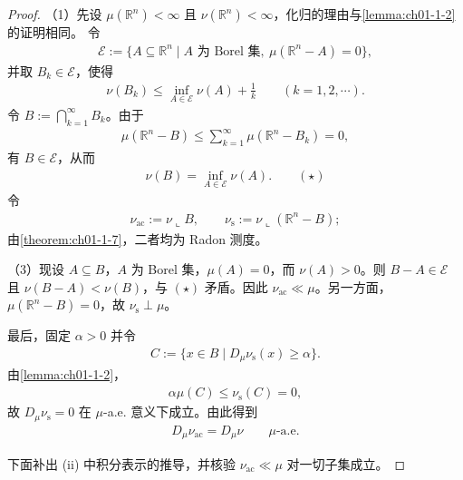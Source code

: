 \documentclass[../../main.tex]{subfiles}%
\begin{document}
\begin{proof}
（1）先设 $\mu(\mathbb{R}^n)<\infty$ 且 $\nu(\mathbb{R}^n)<\infty$，化归的理由与\cref{lemma:ch01-1-2}的证明相同。%
令
\begin{align*}
\mathcal{E}:=\{A\subseteq\mathbb{R}^n\mid A\text{ 为 Borel 集},\ \mu(\mathbb{R}^n-A)=0\},
\end{align*}
并取 $B_k\in\mathcal{E}$，使得
\begin{align*}
\nu(B_k)\leqslant\inf_{A\in\mathcal{E}}\nu(A)+\frac{1}{k}\qquad(k=1,2,\cdots).
\end{align*}
令 $B:=\bigcap_{k=1}^{\infty}B_k$。由于
\begin{align*}
\mu(\mathbb{R}^n-B)\leqslant\sum_{k=1}^{\infty}\mu(\mathbb{R}^n-B_k)=0,
\end{align*}
有 $B\in\mathcal{E}$，从而
\begin{align*}
\nu(B)=\inf_{A\in\mathcal{E}}\nu(A).\qquad(\star)
\end{align*}
令
\begin{align*}
\nu_{\mathrm{ac}}:=\nu\llcorner B,\qquad \nu_{\mathrm{s}}:=\nu\llcorner(\mathbb{R}^n-B);
\end{align*}
由\cref{theorem:ch01-1-7}，二者均为 Radon 测度。%

（3）现设 $A\subseteq B$，$A$ 为 Borel 集，$\mu(A)=0$，而 $\nu(A)>0$。则 $B-A\in\mathcal{E}$ 且 $\nu(B-A)<\nu(B)$，与 $(\star)$ 矛盾。因此 $\nu_{\mathrm{ac}}\ll\mu$。另一方面，$\mu(\mathbb{R}^n-B)=0$，故 $\nu_{\mathrm{s}}\perp\mu$。

最后，固定 $\alpha>0$ 并令
\begin{align*}
C:=\{x\in B\mid D_{\mu}\nu_{\mathrm{s}}(x)\geqslant\alpha\}.
\end{align*}
由\cref{lemma:ch01-1-2}，%
\begin{align*}
\alpha\mu(C)\leqslant\nu_{\mathrm{s}}(C)=0,
\end{align*}
故 $D_{\mu}\nu_{\mathrm{s}}=0$ 在 $\mu$-a.e. 意义下成立。由此得到
\begin{align*}
D_{\mu}\nu_{\mathrm{ac}}=D_{\mu}\nu\qquad\mu\text{-a.e.}
\end{align*}

下面补出 (ii) 中积分表示的推导，并核验 $\nu_{\mathrm{ac}}\ll\mu$ 对一切子集成立。


\end{proof}
\end{document}
